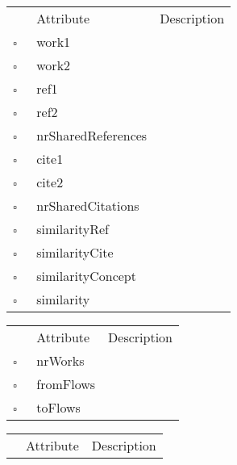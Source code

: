 \begin{table}
\caption{Similarity  }

\begin{longtable}{llp{8cm}}
& Attribute & Description \\
$\square$\ & work1 &  \\
$\square$\ & work2 &  \\
$\square$\ & ref1 &  \\
$\square$\ & ref2 &  \\
$\square$\ & nrSharedReferences &  \\
$\square$\ & cite1 &  \\
$\square$\ & cite2 &  \\
$\square$\ & nrSharedCitations &  \\
$\square$\ & similarityRef &  \\
$\square$\ & similarityCite &  \\
$\square$\ & similarityConcept &  \\
$\square$\ & similarity &  \\
\end{longtable}
\label{attr:Similarity}
\end{table}

\begin{table}
\caption{SourceGroup  }

\begin{longtable}{llp{8cm}}
& Attribute & Description \\
$\square$\ & nrWorks &  \\
$\square$\ & fromFlows &  \\
$\square$\ & toFlows &  \\
\end{longtable}
\label{attr:SourceGroup}
\end{table}

\begin{table}
\caption{UncategorizedReference  }

\begin{longtable}{llp{8cm}}
& Attribute & Description \\
\end{longtable}
\label{attr:UncategorizedReference}
\end{table}

